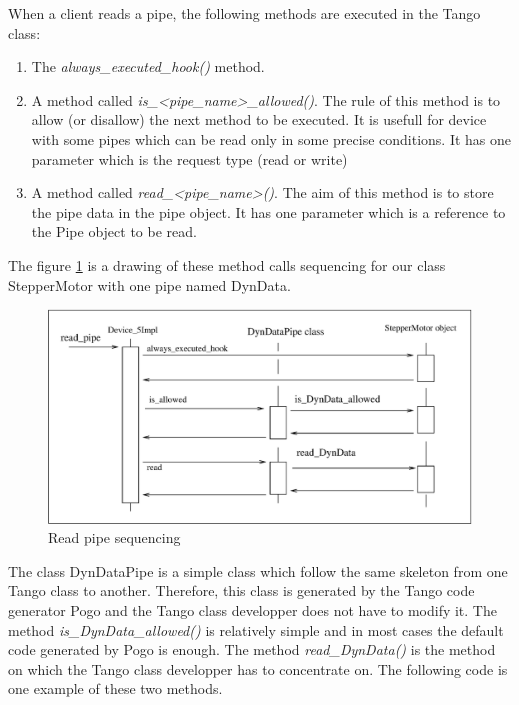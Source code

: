 When a client reads a pipe, the following methods are executed in
the Tango class:
\begin{enumerate}
\item The \emph{always\_executed\_hook()} method.
\item A method called \emph{is\_<pipe\_name>\_allowed()}. The rule of this
method is to allow (or disallow) the next method to be executed. It
is usefull for device with some pipes which can be read only in some
precise conditions. It has one parameter which is the request type
(read or write)
\item A method called \emph{read\_<pipe\_name>()}. The aim of this method
is to store the pipe data in the pipe object. It has one parameter
which is a reference to the Pipe object to be read.
\end{enumerate}
The figure \ref{r_pipe_timing_fig-1} is a drawing of these method
calls sequencing for our class StepperMotor with one pipe named DynData.
\begin{figure}[H]
\begin{centering}
\includegraphics[scale=0.7]{ds_writing/r_pipe}
\par\end{centering}
\caption{Read pipe sequencing\label{r_pipe_timing_fig-1}}
\end{figure}

The class DynDataPipe is a simple class which follow the same skeleton
from one Tango class to another. Therefore, this class is generated
by the Tango code generator Pogo and the Tango class developper does
not have to modify it. The method \emph{is\_DynData\_allowed()} is
relatively simple and in most cases the default code generated by
Pogo is enough. The method \emph{read\_DynData()} is the method on
which the Tango class developper has to concentrate on. The following
code is one example of these two methods.


